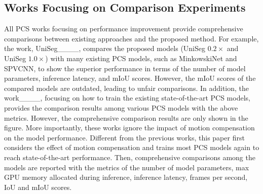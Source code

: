 \subsection{Works Focusing on Comparison Experiments}
All PCS works focusing on performance improvement provide comprehensive comparisons between existing approaches and the proposed method. For example, the work, UniSeg____, compares the proposed models (UniSeg $0.2\times$ and UniSeg $1.0\times$) with many existing PCS models, such as MinkowskiNet and SPVCNN, to show the superior performance in terms of the number of model parameters, inference latency, and mIoU scores. However, the mIoU scores of the compared models are outdated, leading to unfair comparisons. In addition, the work____, focusing on how to train the existing state-of-the-art PCS models, provides the comparison results among various PCS models with the above metrics. However, the comprehensive comparison results are only shown in the figure. More importantly, these works ignore the impact of motion compensation on the model performance. Different from the previous works, this paper first considers the effect of motion compensation and trains most PCS models again to reach state-of-the-art performance. Then, comprehensive comparisons among the models are reported with the metrics of the number of model parameters, max GPU memory allocated during inference, inference latency, frames per second, IoU and mIoU scores.